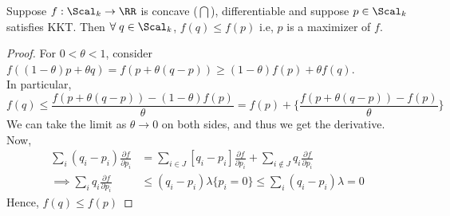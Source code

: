 \begin{theorem}
Suppose $f: \Scal_k \to \RR$ is concave ($\bigcap$), differentiable and suppose $p \in \Scal_k$ satisfies KKT. Then $\forall\; q \in \Scal_k$, $f(q) \leq f(p)$ i.e, $p$ is a maximizer of $f$.
\end{theorem}
\begin{proof}
For $0 < \theta < 1$, consider $f((1-\theta)p + \theta q) = f(p + \theta(q-p)) \geq (1-\theta) f(p) + \theta f(q)$. \\
In particular,
\[f(q) \leq \frac{f(p+\theta(q-p)) - (1-\theta)f(p)}{\theta} = f(p) + \bigg\{\frac{f(p+\theta(q-p)) - f(p)}{\theta}\bigg\}\]
We can take the limit as $\theta \to 0$ on both sides, and thus we get the derivative. Now,
\begin{align*}
    \sum_i (q_i - p_i) \frac{\partial f}{\partial p_i} &= \sum_{i\in J} [q_i-p_i] \frac{\partial f}{\partial p_i} + \sum_{i\notin J} q_i \frac{\partial f}{\partial p_i} \\
    \implies \sum_i q_i\frac{\partial f}{\partial p_i} &\leq (q_i-p_i)\lambda \{p_i = 0\} \leq \sum_i (q_i-p_i)\lambda = 0
\end{align*}
Hence, $f(q) \leq f(p)$
\end{proof}
